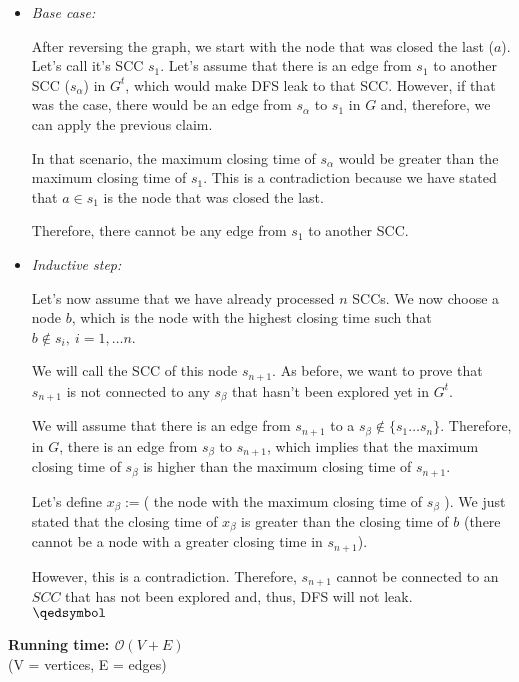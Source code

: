 \documentclass[12pt]{report}
\begin{document}
\begin{itemize}
	\item \textit{Base case:}

After reversing the graph, we start with the node that was closed the last ($a$). Let's call
it's SCC $s_1$. Let's assume that there is an edge from $s_1$ to another SCC ($s_\alpha$) in
$G^t$, which would make DFS leak to that SCC. However, if that was the case, there
would be an edge from $s_\alpha$ to $s_1$ in $G$ and, therefore, we can apply the 
previous claim. 

In that scenario, the maximum closing time of  $s_\alpha$ would be greater than the maximum
closing time of $s_1$. This is a contradiction because we have stated that $a\in s_1$ 
is the node that was closed the last.

Therefore, there cannot be any edge from $s_1$ to another SCC.

\item \textit{Inductive step:}

	Let's now assume that we have already processed $n$ SCCs. We now choose a node $b$,
	which is the node with the highest closing time such that $b \not \in s_i, \
	i=1,\dots n$. 
	
	We will call the SCC of this node $s_{n+1}$.
	As before, we want to prove that $s_{n+1}$ is not 
	connected to any $s_\beta$ that hasn't been explored yet in $G^t$.

	We will assume that there is an edge from $s_{n+1}$ to a $s_{\beta}\not \in 
	\{s_1\dots s_n\}$. Therefore, in $G$, there is an edge from $s_{\beta}$ to
	$s_{n+1}$, which implies that the maximum closing time of $s_{\beta}$ is higher than
	the maximum closing time of $s_{n+1}$. 

	Let's define $x_\beta:=$( the node with the maximum closing time of $s_\beta$ ). 
	We just stated that the closing time of $x_\beta$ is greater than the closing time 
	of $b$ (there cannot be a node with a greater closing time in $s_{n+1}$).

	However, this is a contradiction. Therefore, $s_{n+1}$ cannot
	be connected to an $SCC$ that has not been explored and, thus, DFS will not leak.
	\\ \null \hfill $\qedsymbol$
\end{itemize}

\newpage
{}
\noindent \textbf{\boldmath Running time: $\mathcal{O}(V+E)$}
\\ {\small (V = vertices, E = edges)}
\end{document}
